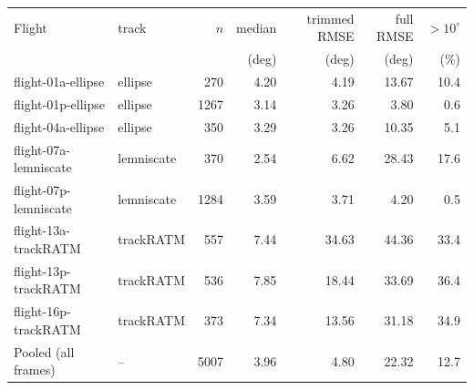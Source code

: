 \footnotesize
\begin{tabular}{llrrrrr}
\toprule
Flight & track & $n$ & median & trimmed RMSE & full RMSE & $>10^\circ$ \\
 & & & (deg) & (deg) & (deg) & (\%) \\
\midrule
flight-01a-ellipse & ellipse & 270 & 4.20 & 4.19 & 13.67 & 10.4 \\
flight-01p-ellipse & ellipse & 1267 & 3.14 & 3.26 & 3.80 & 0.6 \\
flight-04a-ellipse & ellipse & 350 & 3.29 & 3.26 & 10.35 & 5.1 \\
flight-07a-lemniscate & lemniscate & 370 & 2.54 & 6.62 & 28.43 & 17.6 \\
flight-07p-lemniscate & lemniscate & 1284 & 3.59 & 3.71 & 4.20 & 0.5 \\
flight-13a-trackRATM & trackRATM & 557 & 7.44 & 34.63 & 44.36 & 33.4 \\
flight-13p-trackRATM & trackRATM & 536 & 7.85 & 18.44 & 33.69 & 36.4 \\
flight-16p-trackRATM & trackRATM & 373 & 7.34 & 13.56 & 31.18 & 34.9 \\
\midrule
Pooled (all frames) & -- & 5007 & 3.96 & 4.80 & 22.32 & 12.7 \\
\bottomrule
\end{tabular}
